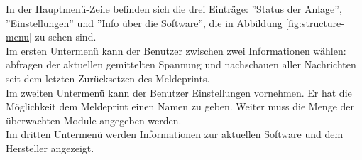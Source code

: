 In der Hauptmenü-Zeile befinden sich die drei Einträge: ''Status der Anlage'', ''Einstellungen'' und ''Info über die Software'', die in Abbildung \ref{fig:structure-menu} zu sehen sind.\\
Im ersten Untermenü kann der Benutzer zwischen zwei Informationen wählen: abfragen der aktuellen gemittelten Spannung und nachschauen aller Nachrichten seit dem letzten Zurücksetzen des Meldeprints.\\
Im zweiten Untermenü kann der Benutzer Einstellungen vornehmen. Er hat die Möglichkeit dem Meldeprint einen Namen zu geben. Weiter muss die Menge der überwachten Module angegeben werden.\\
Im dritten Untermenü werden Informationen zur aktuellen Software und dem Hersteller angezeigt.\\